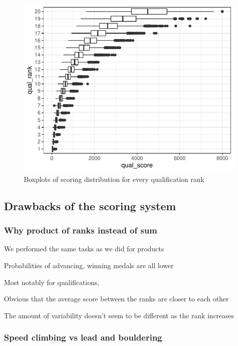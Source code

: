 \documentclass[12pt]{article}
\begin{document}
\begin{figure}
\centering
\includegraphics{draft_files/figure-latex/unnamed-chunk-7-1.pdf}
\caption{Boxplots of scoring distribution for every qualification rank}
\end{figure}

\hypertarget{drawbacks-of-the-scoring-system}{%
\subsection{Drawbacks of the scoring
system}\label{drawbacks-of-the-scoring-system}}

\hypertarget{why-product-of-ranks-instead-of-sum}{%
\subsubsection{Why product of ranks instead of
sum}\label{why-product-of-ranks-instead-of-sum}}

We performed the same tasks as we did for products

Probabilities of advancing, winning medals are all lower

Most notably for qualifications,

Obvious that the average score between the ranks are closer to each
other

The amount of variability doesn't seem to be different as the rank
increases

\hypertarget{speed-climbing-vs-lead-and-bouldering}{%
\subsubsection{Speed climbing vs lead and
bouldering}\label{speed-climbing-vs-lead-and-bouldering}}
\end{document}
